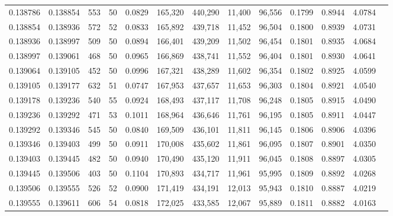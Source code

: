 \begin{tabular}{rrrrrrrrrrrrr}
0.138786 & 0.138854 &   553 &  50 &                                     0.0829 & 165,320 & 440,290 &  11,400 &  96,556 & 0.1799 & 0.8944 & 4.0784 \\
0.138854 & 0.138936 &   572 &  52 &                                     0.0833 & 165,892 & 439,718 &  11,452 &  96,504 & 0.1800 & 0.8939 & 4.0731 \\
0.138936 & 0.138997 &   509 &  50 &                                     0.0894 & 166,401 & 439,209 &  11,502 &  96,454 & 0.1801 & 0.8935 & 4.0684 \\
0.138997 & 0.139061 &   468 &  50 &                                     0.0965 & 166,869 & 438,741 &  11,552 &  96,404 & 0.1801 & 0.8930 & 4.0641 \\
0.139064 & 0.139105 &   452 &  50 &                                     0.0996 & 167,321 & 438,289 &  11,602 &  96,354 & 0.1802 & 0.8925 & 4.0599 \\
0.139105 & 0.139177 &   632 &  51 &                                     0.0747 & 167,953 & 437,657 &  11,653 &  96,303 & 0.1804 & 0.8921 & 4.0540 \\
0.139178 & 0.139236 &   540 &  55 &                                     0.0924 & 168,493 & 437,117 &  11,708 &  96,248 & 0.1805 & 0.8915 & 4.0490 \\
0.139236 & 0.139292 &   471 &  53 &                                     0.1011 & 168,964 & 436,646 &  11,761 &  96,195 & 0.1805 & 0.8911 & 4.0447 \\
0.139292 & 0.139346 &   545 &  50 &                                     0.0840 & 169,509 & 436,101 &  11,811 &  96,145 & 0.1806 & 0.8906 & 4.0396 \\
0.139346 & 0.139403 &   499 &  50 &                                     0.0911 & 170,008 & 435,602 &  11,861 &  96,095 & 0.1807 & 0.8901 & 4.0350 \\
0.139403 & 0.139445 &   482 &  50 &                                     0.0940 & 170,490 & 435,120 &  11,911 &  96,045 & 0.1808 & 0.8897 & 4.0305 \\
0.139445 & 0.139506 &   403 &  50 &                                     0.1104 & 170,893 & 434,717 &  11,961 &  95,995 & 0.1809 & 0.8892 & 4.0268 \\
0.139506 & 0.139555 &   526 &  52 &                                     0.0900 & 171,419 & 434,191 &  12,013 &  95,943 & 0.1810 & 0.8887 & 4.0219 \\
0.139555 & 0.139611 &   606 &  54 &                                     0.0818 & 172,025 & 433,585 &  12,067 &  95,889 & 0.1811 & 0.8882 & 4.0163 \\

\end{tabular}
